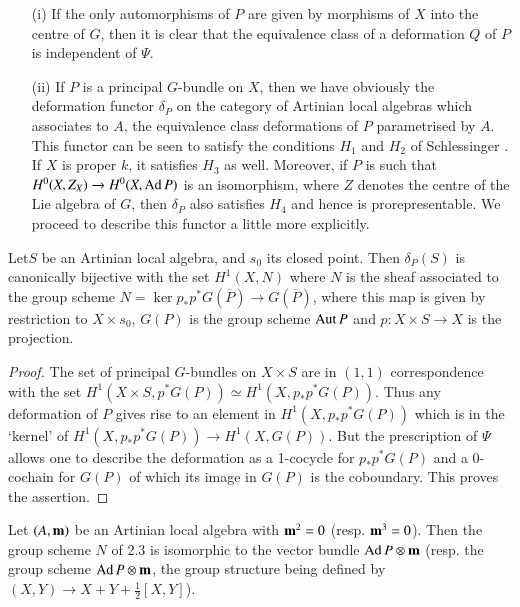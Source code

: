\begin{subremark}\label{art05-rem2.2}
\begin{itemize}
\item[(i)] If the only automorphisms of $P$ are given by morphisms of
$X$ into the centre of $G$, then it is clear that the equivalence
class of a deformation $Q$ of $P$ is independent of $\Psi$.

\item[(ii)] If $P$ is a principal $G$-bundle on $X$, then we have
obviously the deformation functor $\delta_{P}$ on the category of
Artinian local algebras which associates to $A$, the equivalence class
deformations of $P$ parametrised by $A$. This functor can be seen to
satisfy the conditions $H_{1}$ and $H_{2}$ of
Schlessinger \cite[Theorem 2.11]{art05-key7}. If $X$ is proper $k$, it
satisfies $H_{3}$ as well. Moreover, if $P$ is such that
$H^{0}(X,Z_{X})\to H^{0}(X,\operatorname{Ad} P)$ is an isomorphism, where $Z$
denotes the centre of the Lie algebra of $G$, then $\delta_{P}$ also
satisfies $H_{4}$ and hence is prorepresentable. We proceed to
describe this functor a little more explicitly.
\end{itemize}
\end{subremark}

\begin{subprop}\label{art05-prop2.3}
Let\pageoriginale $S$ be an Artinian local algebra, and $s_{0}$ its
closed point. Then $\delta_{P}(S)$ is canonically bijective with the
set $H^{1}(X,N)$ where $N$ is the sheaf associated to the group scheme
$N=\ker p_{*}p^{*}G(\overline{P})\to G(\overline{P})$, where this map
is given by restriction to $X\times s_{0}$, $G(P)$ is the group scheme
$\operatorname{Aut} P$ and $p:X\times S\to X$ is the projection.
\end{subprop}

\begin{proof}
The set of principal $G$-bundles on $X\times S$ are in $(1,1)$
correspondence with the set $H^{1}(X\times S,p^{*}G(P))\simeq
H^{1}(X,p_{*}p^{*}G(P))$. Thus any deformation of $P$ gives rise to an
element in $H^{1}(X,p_{*}p^{*}G(P))$ which is in the `kernel' of
$H^{1}(X,p_{*}p^{*}G(P))\to H^{1}(X,G(P))$. But the prescription of
$\Psi$ allows one to describe the deformation as a 1-cocycle for
$p_{*}p^{*}G(P)$ and a 0-cochain for $G(P)$ of which its image in
$G(P)$ is the coboundary. This proves the assertion.
\end{proof}

\begin{subprop}\label{art05-prop2.4}
Let $(A,\mathbf{m})$ be an Artinian local algebra with $\mathbf{m}^{2}=0$
(resp. $\mathbf{m}^{3}=0$). Then the group scheme $N$ of $2.3$ is isomorphic
to the vector bundle $\operatorname{Ad} P\otimes \mathbf{m}$ (resp. the group scheme $\operatorname{Ad}
P\otimes \mathbf{m}$, the group structure being defined by $(X,Y)\to
X+Y+\frac{1}{2}[X,Y]$). 
\end{subprop}

